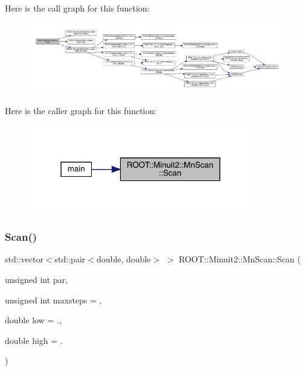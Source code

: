 Here is the call graph for this function\+:
\nopagebreak
\begin{figure}[H]
\begin{center}
\leavevmode
\includegraphics[width=350pt]{de/dd8/classROOT_1_1Minuit2_1_1MnScan_ae488bb0cc7b7127847fdccdadced3ced_cgraph}
\end{center}
\end{figure}
Here is the caller graph for this function\+:
\nopagebreak
\begin{figure}[H]
\begin{center}
\leavevmode
\includegraphics[width=277pt]{de/dd8/classROOT_1_1Minuit2_1_1MnScan_ae488bb0cc7b7127847fdccdadced3ced_icgraph}
\end{center}
\end{figure}
\mbox{\label{classROOT_1_1Minuit2_1_1MnScan_aaad559ec656a90df6e3283885ff2e7ca}} 
\subsubsection{\texorpdfstring{Scan()}{Scan()}\hspace{0.1cm}{\footnotesize\ttfamily [3/3]}}
{\footnotesize\ttfamily std\+::vector$<$std\+::pair$<$double, double$>$ $>$ R\+O\+O\+T\+::\+Minuit2\+::\+Mn\+Scan\+::\+Scan (\begin{DoxyParamCaption}\item[{unsigned int}]{par,  }\item[{unsigned int}]{maxsteps = {},  }\item[{double}]{low = {.},  }\item[{double}]{high = {.} }\end{DoxyParamCaption})}



